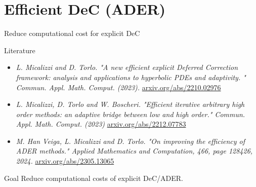 \documentclass[9pt,compress,t,aspectratio=169]{beamer}
\begin{document}
\section{Efficient DeC (ADER)}
\begin{frame}{Reduce computational cost for explicit DeC}
	\begin{block}{Literature}
		\small
		\begin{itemize}
			\item \textit{L. Micalizzi and D. Torlo. "A new efficient explicit Deferred Correction framework: analysis and applications to hyperbolic PDEs and adaptivity. " Commun. Appl. Math. Comput. (2023).}
			\href{https://arxiv.org/abs/2210.02976}{arxiv.org/abs/2210.02976}
			\item \textit{L. Micalizzi, D. Torlo and W. Boscheri. "Efficient iterative arbitrary high order methods: an adaptive bridge between low and high order." Commun. Appl. Math. Comput. (2023)} \href{https://arxiv.org/abs/2212.07783}{arxiv.org/abs/2212.07783} 
			\item \textit{M. Han Veiga, L. Micalizzi and D. Torlo. "On improving the efficiency of ADER methods." Applied Mathematics and Computation, 466, page 128426, 2024.} \href{https://arxiv.org/abs/2305.13065}{arxiv.org/abs/2305.13065} 
		\end{itemize}
	\end{block}	

	\begin{block}{Goal}
		Reduce computational costs of explicit DeC/ADER.
	\end{block}
	
\end{frame}
\end{document}
